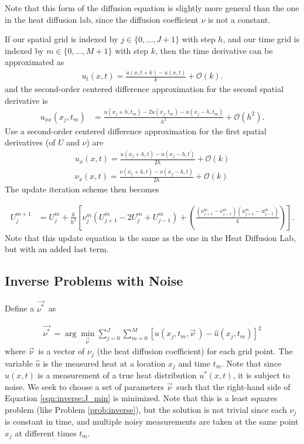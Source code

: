 Note that this form of the diffusion equation is slightly more general than the one in the heat diffusion lab, since the diffusion coefficient $\nu$ is not a constant. 

If our spatial grid is indexed by $j\in\{0,...,J+1\}$ with step $h$, and our time grid is indexed by $m\in\{0,...,M+1\}$ with step $k$, then the time derivative can be approximated as
\begin{align*}
	u_t(x,t) = \frac{u(x,t+k) - u(x,t)}{k} + \mathcal{O}(k).
\end{align*}
and the second-order centered difference approximation for the second spatial derivative is
\begin{align*}
	u_{xx}(x_j,t_m) &= \frac{u(x_j + h,t_m )-2 u(x_j,t_m)- u(x_j - h,t_m)}{h^2} + \mathcal{O}(h^2).
\end{align*}
Use a second-order centered difference approximation for the first spatial derivatives (of $U$ and $\nu$) are
\begin{align*}
	u_x(x,t) = \frac{u(x_j+h,t) - u(x_j-h,t)}{2h} + \mathcal{O}(k)\\
	\nu_x(x,t) = \frac{\nu(x_j+h,t) - \nu(x_j-h,t)}{2h} + \mathcal{O}(k)
\end{align*}
The update iteration scheme then becomes

\begin{align}
U_{j}^{m+1} &= U_{j}^{m} + \frac{ k}{h^2} \left[ \nu_j^m(U_{j+1}^{m}- 2U_{j}^{m} + U_{j-1}^{m} ) + \left(\frac{(\nu^m_{j+1}-\nu^m_{j-1})(u^m_{j+1}-u^m_{j-1})}{4}\right)\right].
\label{eqn:inverse:diffusion_update}
\end{align}
Note that this update equation is the same as the one in the Heat Diffusion Lab, but with an added last term.

\subsection*{Inverse Problems with Noise}

Define a $\vec{\nu^*}^{\,}$ as

\begin{align}
\vec{\nu^*}^{\,} = \arg\min_{\vec{\nu}^{\,}}\sum_{j=0}^{J}\sum_{m=0}^{M}[u(x_j,t_m,\vec{\nu}^{\,}) - \hat u(x_j,t_m)]^2
\label{eqn:inverse:J_min}
\end{align}
where $\vec{\nu}^{\,}$ is a vector of $\nu_j$ (the heat diffusion coefficient) for each grid point.
The variable $\hat u$ is the measured heat at a location $x_j$ and time $t_m$. Note that since $\hat u(x,t)$ is a measurement of a true heat distribution $u^*(x,t)$, it is subject to noise.
We seek to choose a set of parameters $\vec{\nu}^{\,}$ such that the right-hand side of Equation \eqref{eqn:inverse:J_min} is minimized.
Note that this is a least squares problem (like Problem \ref{prob:inverse}), but the solution is not trivial since each $\nu_j$ is constant in time, and multiple noisy measurements are taken at the same point $x_j$ at different times $t_m$.

